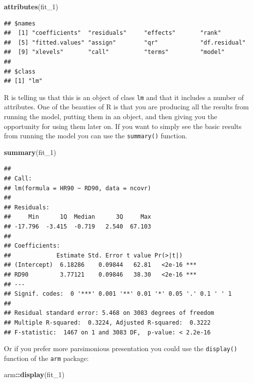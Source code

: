 \documentclass[]{book}
\newenvironment{Shaded}{\begin{snugshade}}{\end{snugshade}}
\newcommand{\DecValTok}[1]{\textcolor[rgb]{0.00,0.00,0.81}{#1}}
\newcommand{\KeywordTok}[1]{\textcolor[rgb]{0.13,0.29,0.53}{\textbf{#1}}}
\newcommand{\NormalTok}[1]{#1}
\newcommand{\OperatorTok}[1]{\textcolor[rgb]{0.81,0.36,0.00}{\textbf{#1}}}
\begin{document}
\begin{Shaded}
\begin{Highlighting}[]
\KeywordTok{attributes}\NormalTok{(fit_}\DecValTok{1}\NormalTok{)}
\end{Highlighting}
\end{Shaded}

\begin{verbatim}
## $names
##  [1] "coefficients"  "residuals"     "effects"       "rank"         
##  [5] "fitted.values" "assign"        "qr"            "df.residual"  
##  [9] "xlevels"       "call"          "terms"         "model"        
## 
## $class
## [1] "lm"
\end{verbatim}

R is telling us that this is an object of class \texttt{lm} and that it includes a number of attributes. One of the beauties of R is that you are producing all the results from running the model, putting them in an object, and then giving you the opportunity for using them later on. If you want to simply see the basic results from running the model you can use the \texttt{summary()} function.

\begin{Shaded}
\begin{Highlighting}[]
\KeywordTok{summary}\NormalTok{(fit_}\DecValTok{1}\NormalTok{)}
\end{Highlighting}
\end{Shaded}

\begin{verbatim}
## 
## Call:
## lm(formula = HR90 ~ RD90, data = ncovr)
## 
## Residuals:
##     Min      1Q  Median      3Q     Max 
## -17.796  -3.415  -0.719   2.540  67.103 
## 
## Coefficients:
##             Estimate Std. Error t value Pr(>|t|)    
## (Intercept)  6.18286    0.09844   62.81   <2e-16 ***
## RD90         3.77121    0.09846   38.30   <2e-16 ***
## ---
## Signif. codes:  0 '***' 0.001 '**' 0.01 '*' 0.05 '.' 0.1 ' ' 1
## 
## Residual standard error: 5.468 on 3083 degrees of freedom
## Multiple R-squared:  0.3224, Adjusted R-squared:  0.3222 
## F-statistic:  1467 on 1 and 3083 DF,  p-value: < 2.2e-16
\end{verbatim}

Or if you prefer more parsimonious presentation you could use the \texttt{display()} function of the \texttt{arm} package:

\begin{Shaded}
\begin{Highlighting}[]
\NormalTok{arm}\OperatorTok{::}\KeywordTok{display}\NormalTok{(fit_}\DecValTok{1}\NormalTok{)}
\end{Highlighting}
\end{Shaded}
\end{document}

